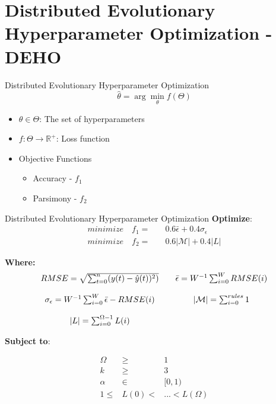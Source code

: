 \documentclass{beamer}
\begin{document}
\section{Distributed Evolutionary Hyperparameter Optimization - DEHO}


\begin{frame}{Distributed Evolutionary Hyperparameter Optimization}
\linespread{2}
$$\hat{\theta} = \arg\min_\theta f(\Theta)$$
\begin{itemize}
    \item $\theta \in \Theta$:  The set of hyperparameters 
    \item $f: \Theta \rightarrow \mathbb{R}^+$: Loss function
    \item Objective Functions
    \begin{itemize}
        \item Accuracy - $f_1$
        \item Parsimony - $f_2$
    \end{itemize}
\end{itemize}
\end{frame}

\begin{frame}{Distributed Evolutionary Hyperparameter Optimization}
\scriptsize
\textbf{Optimize}:
$$
\begin{array}{cc}
    minimize \quad  f_1  = & \quad 0.6\bar{\epsilon} + 0.4\sigma_\epsilon \\
    minimize \quad  f_2  = & \quad 0.6|\mathcal{M}| + 0.4|L|  
\end{array}
$$

\textbf{Where:}
$$
\begin{array}{ccc}
RMSE = \sqrt{\sum_{t=0}^n (y(t) - \hat{y}(t))^2 )} & &
\bar{\epsilon}  =  W^{-1}\sum_{i=0}^W RMSE(i) \\ 
\\
\sigma_\epsilon  =  W^{-1}\sum_{i=0}^W \bar{\epsilon} - RMSE(i) & & |\mathcal{M}| = \sum_{i=0}^{rules} 1 \\ 
\\
|L| = \sum_{i=0}^{\Omega-1} L(i)  & &
\end{array}
$$

\textbf{Subject to}:

$$
\begin{array}{ccc}
\Omega &\geq & 1 \\
k &\geq & 3  \\
\alpha &\in & [0,1)  \\
1 \leq & L(0) < & ... < L(\Omega)  
\end{array}
$$
\end{frame}
\end{document}
